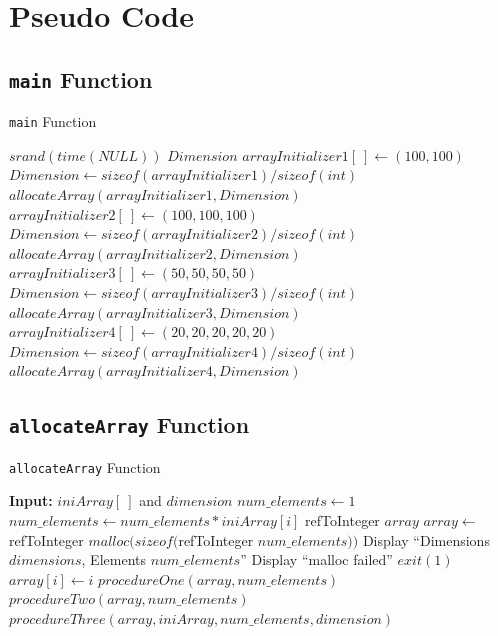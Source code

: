 \documentclass[10pt, conference]{IEEEtran}
\begin{document}
\section{Pseudo Code}
\label{Pseudo Code}

\subsection{\texttt{main} Function}

\begin{algorithm}[h!]
\caption{\texttt{main} Function}
\label{Main}
\begin{algorithmic} 

\STATE $srand(time(NULL))$
\STATE $Dimension$
\STATE
\STATE $arrayInitializer1[\ ] \leftarrow (100, 100)$
\STATE $Dimension \leftarrow sizeof(arrayInitializer1)/sizeof(int)$
\STATE $allocateArray(arrayInitializer1, Dimension)$
\STATE $arrayInitializer2[\ ] \leftarrow (100, 100, 100)$
\STATE $Dimension \leftarrow sizeof(arrayInitializer2)/sizeof(int)$
\STATE $allocateArray(arrayInitializer2, Dimension)$
\STATE $arrayInitializer3[\ ] \leftarrow (50, 50, 50, 50)$
\STATE $Dimension \leftarrow sizeof(arrayInitializer3)/sizeof(int)$
\STATE $allocateArray(arrayInitializer3, Dimension)$
\STATE $arrayInitializer4[\ ] \leftarrow (20, 20, 20, 20, 20)$
\STATE $Dimension \leftarrow sizeof(arrayInitializer4)/sizeof(int)$
\STATE $allocateArray(arrayInitializer4, Dimension)$

\end{algorithmic}
\end{algorithm}

\subsection{\texttt{allocateArray} Function}

\begin{algorithm}[h!]
\caption{\texttt{allocateArray} Function}
\label{allocateArray}
\begin{algorithmic} 

\STATE \textbf{Input:} $iniArray[\ ]$ and $dimension$
\STATE
\STATE $num\_elements \leftarrow 1$
	\STATE $num\_elements \leftarrow num\_elements * iniArray[i]$
\ENDFOR
\STATE refToInteger $array$
\STATE $array \leftarrow$ refToInteger $malloc(sizeof($refToInteger $num\_elements))$
\STATE Display ``Dimensions $dimensions$, Elements $num\_elements$''
	\STATE Display ``malloc failed''
	\STATE $exit(1)$
\ENDIF
\STATE
{}
	\STATE $array[i] \leftarrow i$
\ENDFOR
\STATE $procedureOne(array, num\_elements)$
\STATE $procedureTwo(array, num\_elements)$
\STATE $procedureThree(array, iniArray, num\_elements, dimension)$

\end{algorithmic}
\end{algorithm}
\end{document}
